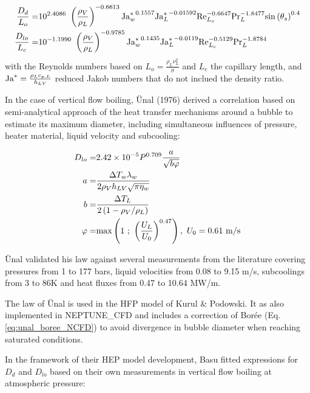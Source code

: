 \begin{align}
\frac{D_{d}}{L_{o}} =& 10^{2.4086}\ \parth{\frac{\rho_{V}}{\rho_{L}}}^{-0.6613} {\Ja^{*}_{w}}^{0.1557} {\Ja^{*}_{L}}^{-0.01592} \Re_{L_{o}}^{-0.6647} \Pr_{L}^{-1.8477} \sin{\theta_{s}}^{0.4}
\label{eq:dd_zhou}
\\
%
\frac{D_{lo}}{L_{c}} =& 10^{-1.1990}\ \parth{\frac{\rho_{V}}{\rho_{L}}}^{-0.9785} {\Ja^{*}_{w}}^{0.1435} {\Ja^{*}_{L}}^{-0.0119} \Re_{L_{c}}^{-0.5129} \Pr_{L}^{-1.8784}
\label{eq:dlo_zhou}
\end{align}
with the Reynolds numbers based on $L_{o} = \frac{\rho_{L}\nu_{L}^{2}}{\sigma}$ and $L_{c}$ the capillary length, and $\mathrm{Ja}^{*} = \frac{\rho_{L}c_{p,L}}{h_{LV}}$ reduced Jakob numbers that do not inclued the density ratio. 


\npar


In the case of vertical flow boiling, \"Unal (1976)\cite{unal_maximum_1976} derived a correlation based on semi-analytical approach of the heat transfer mechanisms around a bubble to estimate its maximum diameter, including simultaneous influences of pressure, heater material, liquid velocity and subcooling:

\begin{align}
D_{lo}=& 2.42\times 10^{-5} P^{0.709}\frac{a}{\sqrt{b\varphi}}
\label{eq:dlo_unal}
\\
\nonumber a =& \frac{\Delta T_{w}\lambda_{w}}{2\rho_{V}h_{LV}\sqrt{\pi \eta_{w}} }\\
\nonumber b =& \frac{\Delta T_{L}}{2\left( 1-\rho_{V}/\rho_{L} \right)}\\
\nonumber \varphi=& \mathrm{max}\left( 1\ ;\ \left( \frac{U_{L}}{U_{0}} \right)^{0.47} \right),\ U_{0}=0.61~\mathrm{m/s}
\end{align}

\"Unal validated his law against several measurements from the literature covering pressures from 1 to 177 bars, liquid velocities from 0.08 to 9.15 m/s, subcoolings from 3 to 86K and heat fluxes from 0.47 to 10.64 MW/m.


\begin{note*}{}
The law of \"Unal is used in the HFP model of Kurul \& Podowski. It as also implemented in NEPTUNE\_CFD and includes a correction of Borée \etal (Eq. \ref{eq:unal_boree_NCFD}) to avoid divergence in bubble diameter when reaching saturated conditions.
\end{note*}

\npar

In the framework of their HEP model development, Basu \etal fitted expressions for $D_{d}$ and $D_{lo}$ based on their own measurements in vertical flow boiling at atmospheric pressure:

